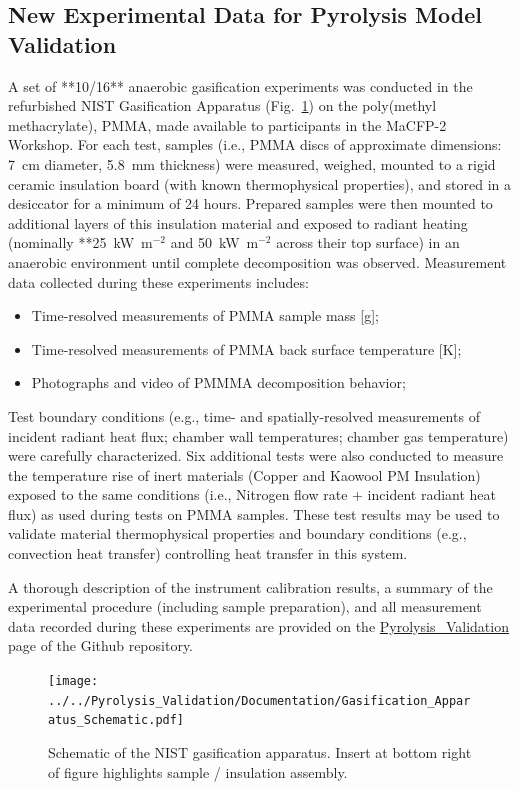 \documentclass[12pt,demo]{article}
\begin{document}
\subsection{New Experimental Data for Pyrolysis Model Validation}
A set of **10/16** anaerobic gasification experiments was conducted in the refurbished NIST Gasification Apparatus (Fig.~\ref{fig:NISTGasApp}) on the poly(methyl methacrylate), PMMA, made available to participants in the MaCFP-2 Workshop. For each test, samples (i.e., PMMA discs of approximate dimensions: 7~cm diameter, 5.8~mm thickness) were measured, weighed, mounted to a rigid ceramic insulation board (with known thermophysical properties), and stored in a desiccator for a minimum of 24 hours. Prepared samples were then mounted to additional layers of this insulation material and exposed to radiant heating (nominally **25~kW~m$^{-2}$ and 50~kW~m$^{-2}$ across their top surface) in an anaerobic environment until complete decomposition was observed. Measurement data collected during these experiments includes:
\begin{itemize}[noitemsep]
\item Time-resolved measurements of PMMA sample mass [g];
\item Time-resolved measurements of PMMA back surface temperature [K];
\item Photographs and video of PMMMA decomposition behavior;
\end{itemize}

Test boundary conditions (e.g., time- and spatially-resolved measurements of incident radiant heat flux; chamber wall temperatures; chamber gas temperature) were carefully characterized. Six additional tests were also conducted to measure the temperature rise of inert materials (Copper and Kaowool PM Insulation) exposed to the same conditions (i.e., Nitrogen flow rate + incident radiant heat flux) as used during tests on PMMA samples. These test results may be used to validate material thermophysical properties and boundary conditions (e.g., convection heat transfer) controlling heat transfer in this system.

A thorough description of the instrument calibration results, a summary of the experimental procedure (including sample preparation), and all measurement data recorded during these experiments are provided on the \href{https://github.com/MaCFP/macfp-db/tree/master/Pyrolysis_Validation/}{Pyrolysis\_Validation} page of the Github repository.

\begin{figure}
     \centering
         \texttt{[image: ../../Pyrolysis\_Validation/Documentation/Gasification\_Apparatus\_Schematic.pdf]}
         \caption{ Schematic of the NIST gasification apparatus. Insert at bottom right of figure highlights sample / insulation assembly.}
         \label{fig:NISTGasApp}
\end{figure}
\end{document}
